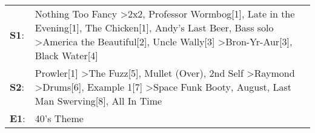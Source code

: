 \begin{supertabular}{p{0.03\textwidth}p{0.92\textwidth}}
 \textbf{S1}:  &  Nothing Too Fancy\textsuperscript{} \textgreater \enspace 2x2\textsuperscript{}, \enspace Professor Wormbog[1]\textsuperscript{}, \enspace Late in the Evening[1]\textsuperscript{}, \enspace The Chicken[1]\textsuperscript{}, \enspace Andy's Last Beer\textsuperscript{}, \enspace Bass solo\textsuperscript{} \textgreater \enspace America the Beautiful[2]\textsuperscript{}, \enspace Uncle Wally[3]\textsuperscript{} \textgreater \enspace Bron-Yr-Aur[3]\textsuperscript{}, \enspace Black Water[4]\textsuperscript{}  \enspace  \\
 \textbf{S2}:  &                                   Prowler[1]\textsuperscript{} \textgreater \enspace The Fuzz[5]\textsuperscript{}, \enspace Mullet (Over)\textsuperscript{}, \enspace 2nd Self\textsuperscript{} \textgreater \enspace Raymond\textsuperscript{} \textgreater \enspace Drums[6]\textsuperscript{}, \enspace Example 1[7]\textsuperscript{} \textgreater \enspace Space Funk Booty\textsuperscript{}, \enspace August\textsuperscript{}, \enspace Last Man Swerving[8]\textsuperscript{}, \enspace All In Time\textsuperscript{}  \enspace  \\
 \textbf{E1}:  &                                                                                                                                                                                                                                                                                                                                                                                                                                                                                                     40's Theme\textsuperscript{}  \enspace  \\
\end{supertabular}
